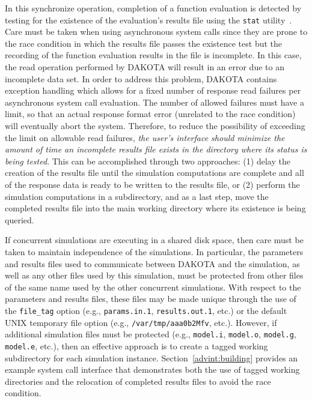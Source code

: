 In this synchronize operation, completion of a function evaluation is
detected by testing for the existence of the evaluation's results file
using the \texttt{stat} utility~\cite{Ker88}. Care must be taken when
using asynchronous system calls since they are prone to the race
condition in which the results file passes the existence test but the
recording of the function evaluation results in the file is
incomplete. In this case, the read operation performed by DAKOTA will
result in an error due to an incomplete data set. In order to address
this problem, DAKOTA contains exception handling which allows for a
fixed number of response read failures per asynchronous system call
evaluation. The number of allowed failures must have a limit, so that
an actual response format error (unrelated to the race condition) will
eventually abort the system. Therefore, to reduce the possibility of
exceeding the limit on allowable read failures, \emph{the user's
interface should minimize the amount of time an incomplete results
file exists in the directory where its status is being tested}. This
can be accomplished through two approaches: (1) delay the creation of
the results file until the simulation computations are complete and
all of the response data is ready to be written to the results file,
or (2) perform the simulation computations in a subdirectory, and as a
last step, move the completed results file into the main working
directory where its existence is being queried.

If concurrent simulations are executing in a shared disk space, then
care must be taken to maintain independence of the simulations. In
particular, the parameters and results files used to communicate
between DAKOTA and the simulation, as well as any other files used by
this simulation, must be protected from other files of the same name
used by the other concurrent simulations. With respect to the
parameters and results files, these files may be made unique through
the use of the \texttt{file\_tag} option (e.g., \texttt{params.in.1},
\texttt{results.out.1}, etc.) or the default UNIX temporary file
option (e.g., \texttt{/var/tmp/aaa0b2Mfv}, etc.). However, if
additional simulation files must be protected (e.g., \texttt{model.i},
\texttt{model.o}, \texttt{model.g}, \texttt{model.e}, etc.), then an
effective approach is to create a tagged working subdirectory for each
simulation instance. Section~\ref{advint:building} provides an example
system call interface that demonstrates both the use of tagged working
directories and the relocation of completed results files to avoid the
race condition.

